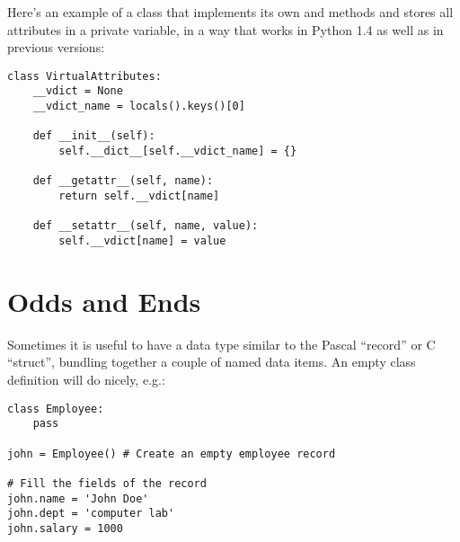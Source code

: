 \documentclass{manual}
\begin{document}
Here's an example of a class that implements its own
 and  methods and stores all
attributes in a private variable, in a way that works in Python 1.4 as
well as in previous versions:

\begin{verbatim}
class VirtualAttributes:
    __vdict = None
    __vdict_name = locals().keys()[0]
     
    def __init__(self):
        self.__dict__[self.__vdict_name] = {}
    
    def __getattr__(self, name):
        return self.__vdict[name]
    
    def __setattr__(self, name, value):
        self.__vdict[name] = value
\end{verbatim}


\section{Odds and Ends \label{odds}}

Sometimes it is useful to have a data type similar to the Pascal
``record'' or C ``struct'', bundling together a couple of named data
items.  An empty class definition will do nicely, e.g.:

\begin{verbatim}
class Employee:
    pass

john = Employee() # Create an empty employee record

# Fill the fields of the record
john.name = 'John Doe'
john.dept = 'computer lab'
john.salary = 1000
\end{verbatim}
\end{document}
